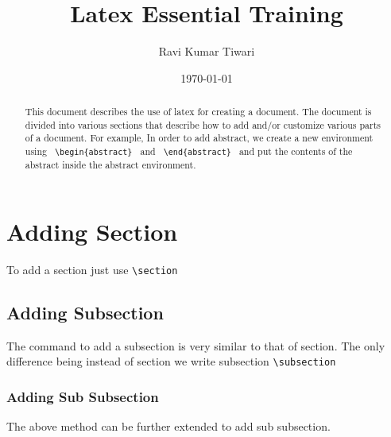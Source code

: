 \documentclass{article}
\begin{document}
\title{Latex Essential Training}
\author{Ravi Kumar Tiwari}
\date{\today}
\maketitle

\begin{abstract}
This document describes the use of latex for creating a document. The document is divided into various sections that describe
how to add and/or customize various parts of a document. For example, In order to add abstract, we create a new environment 
using \verb+ \begin{abstract} + and \verb+ \end{abstract} + and put the contents of the abstract inside the abstract environment.
\end{abstract}


\section{Adding Section}
To add a section just use \verb+\section +

\subsection{Adding Subsection}
The command to add a subsection is very similar to that of section. The only difference being instead of 
section we write subsection \verb+\subsection +

\subsubsection{Adding Sub Subsection}
The above method can be further extended to add sub subsection. 
\end{document}
